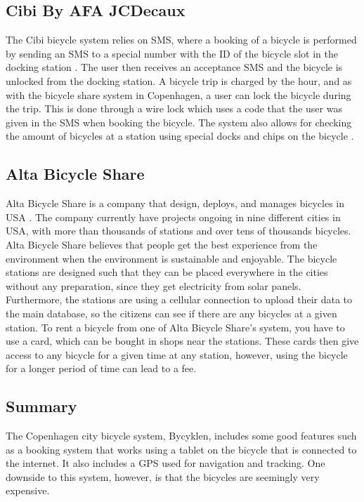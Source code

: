 \subsection{Cibi By AFA JCDecaux}
The Cibi bicycle system relies on SMS, where a booking of a bicycle is performed by sending an SMS to a special number with the ID of the bicycle slot in the docking station \citep{misc:cibi}. 
The user then receives an acceptance SMS and the bicycle is unlocked from the docking station. 
A bicycle trip is charged by the hour, and as with the bicycle share system in Copenhagen, a user can lock the bicycle during the trip. 
This is done through a wire lock which uses a code that the user was given in the SMS when booking the bicycle.
The system also allows for checking the amount of bicycles at a station using special docks and chips on the bicycle \citep{misc:omcibi}.

\subsection{Alta Bicycle Share}\label{subsec:alta}
Alta Bicycle Share is a company that design, deploys, and manages bicycles in USA \citep{misc:AltaBicycleShare}.
The company currently have projects ongoing in nine different cities in USA, with more than thousands of stations and over tens of thousands bicycles. 
Alta Bicycle Share believes that people get the best experience from the environment when the environment is sustainable and enjoyable.
The bicycle stations are designed such that they can be placed everywhere in the cities without any preparation, since they get electricity from solar panels.
Furthermore, the stations are using a cellular connection to upload their data to the main database, so the citizens can see if there are any bicycles at a given station.
To rent a bicycle from one of Alta Bicycle Share's system, you have to use a card, which can be bought in shops near the stations.
These cards then give access to any bicycle for a given time at any station, however, using the bicycle for a longer period of time can lead to a fee.


\subsection{Summary}
The Copenhagen city bicycle system, Bycyklen, includes some good features such as a booking system that works using a tablet on the bicycle that is connected to the internet.
It also includes a GPS used for navigation and tracking.
One downside to this system, however, is that the bicycles are seemingly very expensive.

